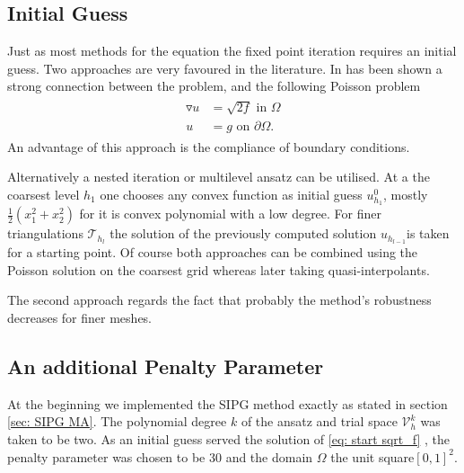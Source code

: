 \subsection{Initial Guess}\label{sec: initial guess}
Just as most methods for the \MA equation the fixed point iteration requires an initial guess. Two approaches are very favoured in the literature.
In \cite[Remark 2.1]{DG2006a} has been shown a strong connection between the \MA problem, and  the following Poisson problem
\begin{align}
	\begin{split}
	\triangledown u &= \sqrt{2f} \text{ in } \Omega \\ 
	u &= g \text{ on }\partial \Omega.
	\end{split}\label{eq: start sqrt_f}
\end{align}
An advantage of this approach is the compliance of boundary conditions.

Alternatively a nested iteration or multilevel ansatz can be utilised. At a the coarsest level $h_1$ one chooses any convex function as initial guess $u^0_{h_1}$, mostly $\frac 1 2 ({x_1^2} + {x_2^2}) $ for it is convex polynomial with a low degree. For finer triangulations $\mathcal{T}_{h_{l}}$ the solution of the previously computed solution $u_{h_{l-1}}$is taken for a starting point. Of course both approaches can be combined using the Poisson solution on the coarsest grid whereas later taking quasi-interpolants.

The second approach regards the fact that probably the method's robustness decreases for finer meshes.


\subsection{An additional Penalty Parameter}
At the beginning we implemented the SIPG method exactly as stated in section \ref{sec: SIPG MA}. The polynomial degree $k$ of the ansatz and trial space $\mathcal V_h^k$ was taken to be two.
As an initial guess served the solution of \eqref{eq: start sqrt_f} , the penalty parameter was chosen to be 30 and the domain $\Omega$ the unit square$[0,1]^2$.

